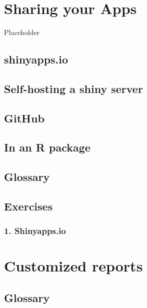 \documentclass[
]{book}
\begin{document}
\hypertarget{sharing}{%
\chapter{Sharing your Apps}\label{sharing}}

Placeholder

\hypertarget{shinyapps.io}{%
\section{shinyapps.io}\label{shinyapps.io}}

\hypertarget{self-hosting-a-shiny-server}{%
\section{Self-hosting a shiny server}\label{self-hosting-a-shiny-server}}

\hypertarget{github}{%
\section{GitHub}\label{github}}

\hypertarget{in-an-r-package}{%
\section{In an R package}\label{in-an-r-package}}

\hypertarget{glossary-sharing}{%
\section{Glossary}\label{glossary-sharing}}

\hypertarget{exercises-sharing}{%
\section{Exercises}\label{exercises-sharing}}

\hypertarget{shinyapps.io-1}{%
\subsection{1. Shinyapps.io}\label{shinyapps.io-1}}

\hypertarget{reports}{%
\chapter{Customized reports}\label{reports}}

\hypertarget{glossary-reports}{%
\section{Glossary}\label{glossary-reports}}
\end{document}

